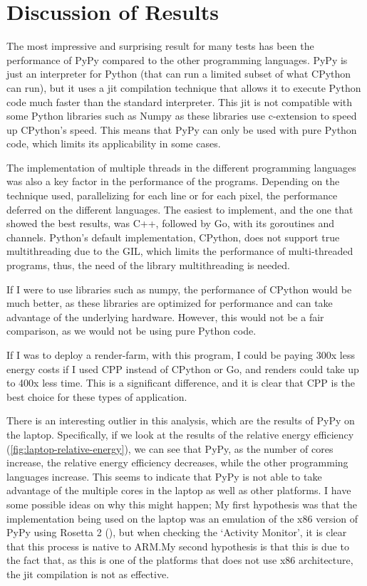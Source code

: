 \section{Discussion of Results}

The most impressive and surprising result for many tests has been the performance of PyPy compared to the other programming languages. PyPy is just an interpreter for Python (that can run a limited subset of what \gls{CPython} can run), but it uses a \gls{jit} compilation technique that allows it to execute Python code much faster than the standard interpreter. This \gls{jit} is not compatible with some Python libraries such as Numpy \cite{numpy} as these libraries use \gls{c-extension} to speed up \gls{CPython}'s speed. This means that PyPy can only be used with pure Python code, which limits its applicability in some cases.

The implementation of multiple threads in the different programming languages was also a key factor in the performance of the programs. Depending on the technique used, parallelizing for each line or for each pixel, the performance deferred on the different languages. The easiest to implement, and the one that showed the best results, was C++, followed by Go, with its \glspl{goroutine} and \glspl{channel}. Python's default implementation, \gls{CPython}, does not support true multithreading due to the \gls{GIL}, which limits the performance of multi-threaded programs, thus, the need of the library multithreading is needed.

If I were to use libraries such as \Gls{numpy}, the performance of \gls{CPython} would be much better, as these libraries are optimized for performance and can take advantage of the underlying hardware. However, this would not be a fair comparison, as we would not be using pure Python code.

If I was to deploy a render-farm, with this program, I could be paying 300x less energy costs if I used \gls{CPP} instead of \gls{CPython} or Go, and renders could take up to 400x less time. This is a significant difference, and it is clear that \gls{CPP} is the best choice for these types of application.

There is an interesting outlier in this analysis, which are the results of PyPy on the laptop. Specifically, if we look at the results of the relative energy efficiency (\autoref{fig:laptop-relative-energy}), we can see that PyPy, as the number of cores increase, the relative energy efficiency decreases, while the other programming languages increase. This seems to indicate that PyPy is not able to take advantage of the multiple cores in the laptop as well as other platforms. I have some possible ideas on why this might happen; My first hypothesis was that the implementation being used on the laptop was an emulation of the x86 version of PyPy using Rosetta 2 (\cite{apple:rosetta2}), but when checking the `Activity Monitor', it is clear that this process is native to \gls{ARM}.\@ My second hypothesis is that this is due to the fact that, as this is one of the platforms that does not use x86 architecture, the \gls{jit} compilation is not as effective.


